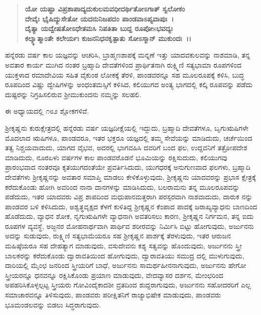\begin{verse}
\textbf{ಯೋ ಯಷ್ಟಾ ವಿಪ್ರಶಾಪಾದ್ಯದುಕುಲಮವಧೀದರ್ಥಿತೋಽಗಾತ್ ಸ್ವಲೋಕಂ}\\\textbf{ದೇವೈಃ ಭೈಷಿದ್ಯುಸೇತೋ ಯದನುನಿಜಪದಂ ಪಾಂಡವಾಽಪ್ಯವಾಪುಃ~।}\\\textbf{ದೈತ್ಯಾ ಯದ್ವೇಷತೋಽಧೇತಮಸಿ ನಿಪತಿತಾ ಬುದ್ದ ರೂಪೋsಭವದ್ಯಃ}\\\textbf{ಕಲ್ಕ್ಯಾತ್ಮಾಂತೇ ಕಲೇರ್ಯಃ ಕುಜನನಿಧನಕೃತ್ಪಾತು ಸೋಽಸ್ಮಾನ್ ಮುಕುಂದಃ~।।}
\end{verse}

ಹನ್ನೆರಡು ವರ್ಷ ಕಾಲ ಯಜ್ಞವನ್ನು ಆಚರಿಸಿ, ಬ್ರಾಹ್ಮಣಶಾಪಕ್ಕೆ ಮನ್ನಣೆ ಇತ್ತು ಯಾದವ\-ಕುಲವನ್ನು ನಾಶಮಾಡಿ, ತನ್ನ ಅವತಾರ ಕಾರ್ಯ ಮುಗಿದ ನಂತರ ಬ್ರಹ್ಮಾದಿ ದೇವತೆಗಳಿಂದ ಪ್ರಾರ್ಥಿತನಾಗಿ ರುಕ್ಷ್ಮಿಣಿ ಸತ್ಯಭಾಮಾ ರೂಪಗಳಿಂದ ಯುಕ್ತಳಾದ ರಮಾದೇವಿಯ ಸಹಿತ ವೈಕುಂಠ ಲೋಕಕ್ಕೆ ತೆರಳಿ, ಪಾಂಡವರನ್ನೂ ಸಹ ಮೂಲರೂಪಕ್ಕೆ ಕಳಿಸಿ, ಬುದ್ಧ ರೂಪದಿಂದ ವಿಷ್ಣು ದ್ವೇಷಿಗಳನ್ನು ಅಂಧಂತಮಸ್ಸಿಗೆ ಕಳಿಸಿದ, ಕಲಿಯುಗದ ಅಂತ್ಯ ಭಾಗದಲ್ಲಿ ಕಲ್ಕಿ ರೂಪವನ್ನು ಪಡೆದು ದುಷ್ಟರನ್ನು ನಿಗ್ರಹಿಸಲಿರುವ ಶ‍್ರೀಮುಕುಂದನು ನಮ್ಮನ್ನು ಸಲಹಲಿ.

ಈ ಅಧ್ಯಾಯದಲ್ಲಿ ೧೮೨ ಶ್ಲೋಕಗಳಿವೆ.

ಶ‍್ರೀಕೃಷ್ಣನು ಕುರುಕ್ಷೇತ್ರದಲ್ಲಿ ಹನ್ನೆರಡು ವರ್ಷ ಯಜ್ಞದೀಕ್ಷೆಯಲ್ಲಿ ಇದ್ದುದು, ಬ್ರಹ್ಮಾದಿ ದೇವತೆಗಳೂ, ಬೃಗುಋಷಿಗಳೇ ಮೊದಲಾದ ಋಷಿಗಳೂ, ಪಾಂಡವರೂ, ಇತರ ಭಕ್ತರೂ ಯಜ್ಞದಲ್ಲಿ ತಮ್ಮ ಸೇವೆಯನ್ನು ಮಾಡಿದುದು, ಚರ್ಚೆಯಿಂದ ತತ್ವ ನಿಶ್ಚಯವಾದುದು, ಯಾಗದ ವೈಭವ, ಅದರಲ್ಲಿ ಭಾಗವಹಿಸಿ ದವರಿಗೆ ಬಂದ ಫಲ, ಉದ್ದವನಿಗೆ ತತ್ರೋಪದೇಶ ಮಾಡಿದುದು, ನೂರಏಳು ವರ್ಷಗಳ ಕಾಲ ಪಾಂಡವರೊಡನೆ ಭೂಮಿಯನ್ನು ರಕ್ಷಿಸುದುದು, ಕಲಿಯುಗವು ಪ್ರಾರಂಭವಾದ ನಂತರವೂ ಕೃತಯುಗದಂತೆಯೇ ಪ್ರವರ್ತಿಸಿದುದು, ಯುಗಧರಕ್ಕೆ ಅನುಗುಣವಾದ ಫಲಗಳು, ಬ್ರಹ್ಮಾದಿ ದೇವತೆಗಳು ಶ‍್ರೀಕೃಷ್ಣನನ್ನು ಅವತಾರ ಸಮಾಪ್ತಿ ಮಾಡಲು ಕೇಳಿಕೊಳ್ಳುವುದು, ಶ‍್ರೀಕೃಷ್ಣನು ಯಾದವರನ್ನು ಪ್ರಭಾಸ ಕ್ಷೇತ್ರಕ್ಕೆ ಕರೆದುಕೊಂಡು ಹೋಗಿ ಅವರಿಂದ ನಾನಾ ದಾನಗಳನ್ನು ಮಾಡಿಸಿದುದು, ಬಲರಾಮನು ತನ್ನ ಮೂಲರೂಪವನ್ನು ಪಡೆದುದು, ಇತರ ಯಾದವರು ವಿಪ್ರ ಶಾಪದಿಂದ ಮಧುಪಾನಮತ್ತರಾಗಿ ಪರಸ್ಪರವಾಗಿ ನಾಶವಾದುದು, ದಾರುಕ ನನ್ನು ಪಾಂಡವರ ಬಳಿ ಕಳಿಸಿದುದು, ಅಶ್ವತ್ಥವೃಕ್ಷದ ಕೆಳಗೆ ಕುಳಿತಿದ್ದ ಶ‍್ರೀಕೃಷ್ಣನ ಕೆಂಪಾದ ಪಾದಕ್ಕೆ ಜರಾಖ್ಯವ್ಯಾಧನು ಬಾಣದಿಂದ ಹೊಡೆದುದು, ವ್ಯಾಧನ ಶೋಕ, ನೃಗುಋಷಿಗಳೇ ವ್ಯಾಧನಾಗಿ ಅವತರಿಸಲು ಕಾರಣ, ಶ‍್ರೀಕೃಷ್ಣನ ನಿರ್ಗಮನ, ತನ್ನ ಐದು ರೂಪಗಳ ವ್ಯವಸ್ಥೆ, ಅಜ್ಜನರ ಮೋಹನಾರ್ಥವಾಗಿ ಪಾರ್ಥಿವ ಶರೀರವನ್ನು ನಿರ್ಮಿಸಿ ಬಿಟ್ಟು ಹೋಗುವುದು, ಅರ್ಜುನನು ಅದನ್ನು ಸುಡುವುದು, ರುಕ್ಷ್ಮಿಣಿ ಸತ್ಯಭಾಮೆಯರೂ ಸಹ ಶ‍್ರೀಕೃಷ್ಣನ ಪಾರ್ಶಕ್ಕೆ ತೆರಳುವುದು, ಇತರ ಆರುಜನ ಮಹಿಷ್ಠೆಯರೂ ಸಹ ದೇಹತ್ಯಾಗ ಮಾಡುವುದು, ವಸುದೇವನು ಕಶ್ಯ ಸತ್ವವನ್ನು ಹೊಂದುವುದು, ಅರ್ಜುನನು ಸ್ತ್ರೀ ಬಾಲಕರನ್ನು ಕರೆದುಕೊಂಡು ದ್ವಾರಾವತಿಯಿಂದ ಹೋಗುವುದು, ದ್ವಾರಾವತಿಯು ಸಮುದ್ರ ದಲ್ಲಿ ಮುಳುಗುವುದು, ದಾರಿಯಲ್ಲಿ ಮೈಂಛ ಜನರಿಂದ ಸ್ತ್ರೀಯರಿಗೆ ಬಾಧೆ, ಅರ್ಜುನನು ಸಾಮರ್ಥಹೀನನಾಗುವುದು, ಅರ್ಜುನನು ಹೇಗೋ ಸ್ತ್ರೀಯರನ್ನೂ ಧನವನ್ನೂ ರಕ್ಷಿಸಿಕೊಂಡು ಪ್ರಯಾಣ ಮಾಡುವುದು, ವೇದವ್ಯಾಸರ ದರ್ಶನ, ಮೇಂಛರಿಂದ ಅಪಹರಿಸಿಕೊಳ್ಳಲ್ಪಟ್ಟ ಸ್ತ್ರೀಯರು ಗೋವಿಂದೈಕಾದಶೀ ವ್ರತದಿಂದ ಶುದ್ದರಾಗುವುದು, ಅರ್ಜುನನು ಸಹೋದರರಿಗೆ ಎಲ್ಲ ಸಮಾಚಾರವನ್ನೂ ತಿಳಿಸುವುದು, ಪಾಂಡವರು ಪರೀಕ್ಷಿತನಿಗೆ ರಾಜ್ಯಾಭಿಷೇಕ ಮಾಡುವುದು, ಪಾಂಡವರು ಭೂಮಂಡಲವನ್ನು ಬಿಡಲು ಸಿದ್ಧರಾಗುವುದು.

